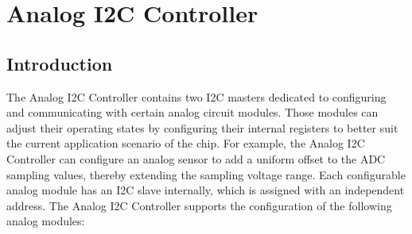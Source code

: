 \documentclass[main\_\_EN.tex]{subfiles}
\begin{document}

\ifglobal
\else
    {\let\clearpage\relax \listoftodos}
    {\let\clearpage\relax \listofdonetodos}
    \tableofcontents
\fi



\hypertarget{anai2c}{}
\chapter{Analog I2C Controller}
\label{mod:anai2c}




\section{Introduction}


The Analog I2C Controller contains two I2C masters dedicated to configuring and communicating with certain analog circuit modules. Those modules can adjust their operating states by configuring their internal registers to better suit the current application scenario of the chip. For example, the Analog I2C Controller can configure an analog sensor to add a uniform offset to the ADC sampling values, thereby extending the sampling voltage range. Each configurable analog module has an I2C slave internally, which is assigned with an independent address. The Analog I2C Controller supports the configuration of the following analog modules:
\end{document}
